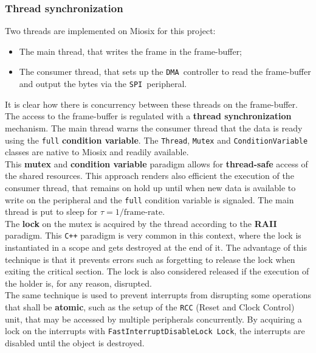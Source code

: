 \documentclass[10pt,a4]{article}
\newcommand{\spi}{\texttt{SPI }}
\newcommand{\dma}{\texttt{DMA }}
\begin{document}
\subsubsection{Thread synchronization}


Two threads are implemented on Miosix for this project:
\begin{itemize}
\item The main thread, that writes the frame in the frame-buffer;
\item The consumer thread, that sets up the \dma controller to read the frame-buffer and output the bytes via the \spi peripheral.
\end{itemize}
It is clear how there is  concurrency between these threads on the frame-buffer. The access to the frame-buffer is regulated with a \textbf{thread synchronization} mechanism. The main thread warns the consumer thread that the data is ready using the \lstinline{full} \textbf{condition variable}. The \lstinline{Thread},  \lstinline{Mutex} and  \lstinline{ConditionVariable} classes are native to Miosix and readily available.   \\

This \textbf{mutex} and \textbf{condition variable} paradigm allows for \textbf{thread-safe} access of the shared resources. This approach renders also efficient the execution of the consumer thread, that remains on hold up until when new data is available to write on the peripheral and the \lstinline{full} condition variable is signaled. The main thread is put to sleep for $\tau = 1 /\text{frame-rate}$. \\

The \textbf{lock} on the mutex is acquired by the thread according to the \textbf{RAII} paradigm. This \texttt{C++} paradigm is very common in this context, where the lock is instantiated in a scope and gets destroyed at the end of it. The advantage of this technique is that it prevents errors such as forgetting to release the lock when exiting the critical section. The lock is also considered released if the execution of the holder is, for any reason, disrupted.\\

The same technique is used to prevent interrupts from disrupting some operations that shall be \textbf{atomic}, such as the setup of the \texttt{RCC} (Reset and Clock Control) unit, that may be accessed by multiple peripherals concurrently. By acquiring a lock on the interrupts with \lstinline{FastInterruptDisableLock Lock}, the interrupts are disabled until the object is destroyed.
\end{document}

